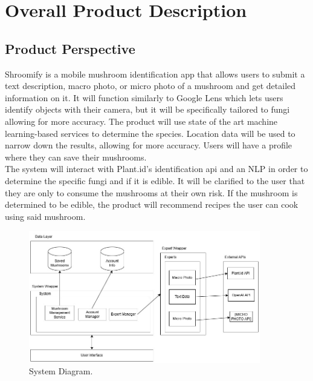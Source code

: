 \documentclass{article}
\begin{document}


\section{Overall Product Description}
\label{sec:overall_description}


\subsection{Product Perspective}
\label{sub:product_perspective}
Shroomify is a mobile mushroom identification app that allows users to submit a text description, macro photo, or micro photo of a mushroom and get detailed information on it. It will function similarly to Google Lens which lets users identify objects with their camera, but it will be specifically tailored to fungi allowing for more accuracy. The product will use state of the art machine learning-based services to determine the species. Location data will be used to narrow down the results, allowing for more accuracy. Users will have a profile where they can save their mushrooms.\\

The system will interact with Plant.id's identification api and an NLP in order to determine the specific fungi and if it is edible. It will be clarified to the user that they are only to consume the mushrooms at their own risk. If the mushroom is determined to be edible, the product will recommend recipes the user can cook using said mushroom. \\

\begin{figure}[h!]
    \centering
    \includegraphics[width=0.9\textwidth]{BlockDiagram.jpg}
    \caption{System Diagram.}
    \label{fig:example}
\end{figure}
\end{document}
